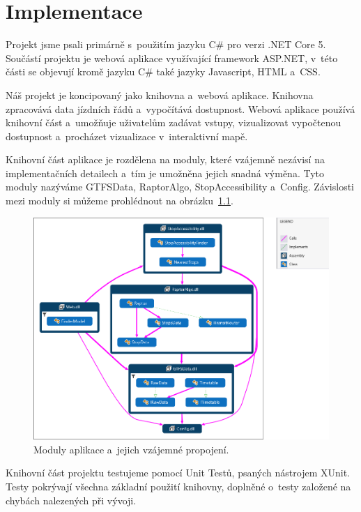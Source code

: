 \chapter{Implementace}\label{kapitola-Implementace}

Projekt jsme psali primárně s~použitím jazyku C\# pro verzi .NET Core 5. Součástí projektu je webová aplikace využívající framework ASP.NET, v~této části se objevují kromě jazyku C\# také jazyky Javascript, HTML a~CSS.

Náš projekt je koncipovaný jako knihovna a~webová aplikace. Knihovna zpracovává data jízdních řádů a~vypočítává dostupnost. Webová aplikace používá knihovní část a~umožňuje uživatelům zadávat vstupy, vizualizovat vypočtenou dostupnost a~procházet vizualizace v~interaktivní mapě.

Knihovní část aplikace je rozdělena na moduly, které vzájemně nezávisí na implementačních detailech a~tím je umožněna jejich snadná výměna. Tyto moduly nazýváme GTFSData, RaptorAlgo, StopAccessibility a~Config. Závislosti mezi moduly si můžeme prohlédnout na obrázku~\ref{fig:library-modules}.

\begin{figure}[ht]
    \centering
    \includegraphics[width=\textwidth]{../img/codemap}
    \caption{Moduly aplikace a~jejich vzájemné propojení.}
    \label{fig:library-modules}
\end{figure}

Knihovní část projektu testujeme pomocí Unit Testů, psaných nástrojem XUnit. Testy pokrývají všechna základní použití knihovny, doplněné o~testy založené na chybách nalezených při vývoji.




